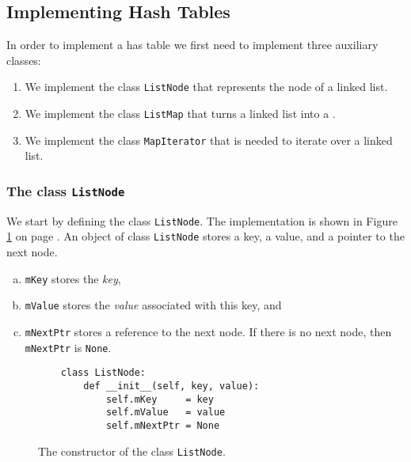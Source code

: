 

\subsection{Implementing Hash Tables}
In order to implement a has table we first need to implement three auxiliary classes:
\begin{enumerate}
\item We implement the class \texttt{ListNode} that represents the node of a linked list.
\item We implement the class \texttt{ListMap} that turns a linked list into a .
\item We implement  the class \texttt{MapIterator} that is needed to iterate over a linked list.
\end{enumerate}

\subsubsection{The class \texttt{ListNode}}
We start by defining the class \texttt{ListNode}.
The implementation is shown in Figure \ref{fig:ListNode.ipynb} on page \pageref{fig:ListNode.ipynb}.
An object of class \texttt{ListNode} stores a key, a value, and a pointer to the next node.
\begin{enumerate}[(a)]
\item \texttt{mKey}     stores the \emph{key},
\item \texttt{mValue}   stores the \emph{value} associated with this key, and
\item \texttt{mNextPtr} stores a reference to the next node.  If there is no next node, then 
      \texttt{mNextPtr} is \texttt{None}.
\end{enumerate}

\begin{figure}[!ht]
\centering
\begin{verbatim}
    class ListNode:
        def __init__(self, key, value):
            self.mKey     = key
            self.mValue   = value
            self.mNextPtr = None                
\end{verbatim}
\vspace*{-0.3cm}
\caption{The constructor of the class \texttt{ListNode}.}
\label{fig:ListNode.ipynb}
\end{figure}

